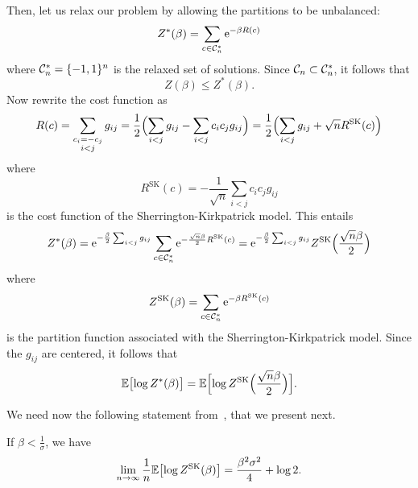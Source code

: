 Then, let us relax our problem by allowing the partitions to be unbalanced:
\begin{equation}
  Z^*(\beta) = \sum_{c\in{\cal C}^*_n}\mathrm{e}^{-\beta R(c)}
\end{equation}
where ${\cal C}^*_n=\{-1,1\}^n$ is the relaxed set of solutions. 
Since ${\cal C}_n \subset{\cal C}^*_n$,
it follows that
\begin{equation}\label{eq:relax}
  Z(\beta)\leq Z^*(\beta).
\end{equation}
Now rewrite the cost function as
\begin{equation}
R(c) = \sum_{\substack{c_i=-c_j\\i<j}} g_{ij}
  = \frac{1}{2}\Bigl(\sum_{i<j}g_{ij} - \sum_{i<j}c_ic_jg_{ij}\Bigr)
  = \frac{1}{2}\Bigl(\sum_{i<j}g_{ij} + \sqrt{n}R^{\text{SK}}(c)\Bigr)
\end{equation}
where
\begin{equation}
R^{\text{SK}}(c) = -\frac{1}{\sqrt{n}}\sum_{i<j}c_ic_jg_{ij}
\end{equation}
is the cost function of the Sherrington-Kirkpatrick model.
This entails
\begin{equation}
  Z^*(\beta)
    = \mathrm{e}^{-\frac{\beta}{2}\sum_{i<j}g_{ij}}
      \sum_{c\in{\cal C}^*_n} \mathrm{e}^{-\frac{\sqrt{n}\beta}{2} R^{\text{SK}}(c)}
    = \mathrm{e}^{-\frac{\beta}{2}\sum_{i<j}g_{ij}}Z^{\text{SK}}
      \Bigl(\frac{\sqrt{n}\beta}{2}\Bigr)
\end{equation}
where
\begin{equation}
  Z^{\text{SK}}(\beta) = \sum_{c\in{\cal C}^*_n}\mathrm{e}^{-\beta R^{\text{SK}}(c)}
\end{equation}
is the partition function associated with the Sherrington-Kirkpatrick model.
Since the $g_{ij}$ are centered, it follows that
\begin{equation}\label{eq:eq}
  \mathbb{E} \bigl[\log Z^*(\beta)\bigr] 
 = \mathbb{E} \Bigl[ \log Z^{\text{SK}}\Bigl(\frac{\sqrt{n}\beta}{2}\Bigr)\Bigr].
\end{equation}

We need now the following statement from~\citep{talagrand03},
that we present next.

\begin{theorem}\label{th:tal}
If $\beta<\frac{1}{\sigma}$, we have
\begin{equation}
  \lim_{n\to\infty}\frac{1}{n}\mathbb{E} \bigl[\log Z^{\text{SK}}(\beta)\bigr]
    = \frac{\beta^2\sigma^2}{4} + \log 2.
\end{equation}
\end{theorem}

